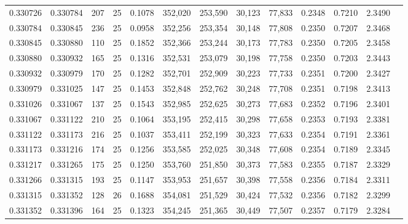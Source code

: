 \begin{tabular}{rrrrrrrrrrrrr}
0.330726 & 0.330784 &   207 &  25 &                                     0.1078 & 352,020 & 253,590 &  30,123 &  77,833 & 0.2348 & 0.7210 & 2.3490 \\
0.330784 & 0.330845 &   236 &  25 &                                     0.0958 & 352,256 & 253,354 &  30,148 &  77,808 & 0.2350 & 0.7207 & 2.3468 \\
0.330845 & 0.330880 &   110 &  25 &                                     0.1852 & 352,366 & 253,244 &  30,173 &  77,783 & 0.2350 & 0.7205 & 2.3458 \\
0.330880 & 0.330932 &   165 &  25 &                                     0.1316 & 352,531 & 253,079 &  30,198 &  77,758 & 0.2350 & 0.7203 & 2.3443 \\
0.330932 & 0.330979 &   170 &  25 &                                     0.1282 & 352,701 & 252,909 &  30,223 &  77,733 & 0.2351 & 0.7200 & 2.3427 \\
0.330979 & 0.331025 &   147 &  25 &                                     0.1453 & 352,848 & 252,762 &  30,248 &  77,708 & 0.2351 & 0.7198 & 2.3413 \\
0.331026 & 0.331067 &   137 &  25 &                                     0.1543 & 352,985 & 252,625 &  30,273 &  77,683 & 0.2352 & 0.7196 & 2.3401 \\
0.331067 & 0.331122 &   210 &  25 &                                     0.1064 & 353,195 & 252,415 &  30,298 &  77,658 & 0.2353 & 0.7193 & 2.3381 \\
0.331122 & 0.331173 &   216 &  25 &                                     0.1037 & 353,411 & 252,199 &  30,323 &  77,633 & 0.2354 & 0.7191 & 2.3361 \\
0.331173 & 0.331216 &   174 &  25 &                                     0.1256 & 353,585 & 252,025 &  30,348 &  77,608 & 0.2354 & 0.7189 & 2.3345 \\
0.331217 & 0.331265 &   175 &  25 &                                     0.1250 & 353,760 & 251,850 &  30,373 &  77,583 & 0.2355 & 0.7187 & 2.3329 \\
0.331266 & 0.331315 &   193 &  25 &                                     0.1147 & 353,953 & 251,657 &  30,398 &  77,558 & 0.2356 & 0.7184 & 2.3311 \\
0.331315 & 0.331352 &   128 &  26 &                                     0.1688 & 354,081 & 251,529 &  30,424 &  77,532 & 0.2356 & 0.7182 & 2.3299 \\
0.331352 & 0.331396 &   164 &  25 &                                     0.1323 & 354,245 & 251,365 &  30,449 &  77,507 & 0.2357 & 0.7179 & 2.3284 \\

\end{tabular}
